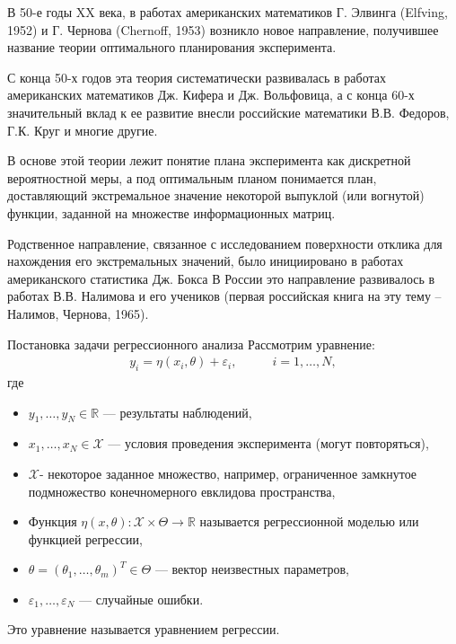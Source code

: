 \documentclass[10pt,slidestop,usepdftitle=false]{beamer}
\begin{document}
\begin{frame}
В 50-е годы XX века, в работах американских математиков Г. Элвинга (Elfving, 1952) и Г. Чернова (Chernoff, 1953) возникло новое направление, получившее название теории оптимального планирования эксперимента. 
\bigskip

\pause

С конца 50-х годов эта теория систематически развивалась в работах американских математиков Дж. Кифера и Дж. Вольфовица, а с конца 60-х значительный вклад к ее развитие внесли российские математики В.В. Федоров, Г.К. Круг и многие другие.

\bigskip

\pause

В основе этой теории лежит понятие плана эксперимента как дискретной вероятностной меры, а под оптимальным планом понимается план, доставляющий экстремальное значение некоторой выпуклой (или вогнутой) функции, заданной на множестве информационных матриц.

\bigskip
\pause

Родственное направление, связанное с исследованием поверхности отклика для нахождения его экстремальных значений, было инициировано в работах американского статистика Дж. Бокса  В России это направление развивалось в работах В.В. Налимова и его учеников (первая российская книга на эту тему – Налимов, Чернова, 1965).


\end{frame}
\begin{frame}{Постановка задачи регрессионного анализа}
 Рассмотрим уравнение:
 \begin{align*}
	y_{i} = \eta(x_i,\theta) + \varepsilon_{i}, \qquad &i = 1, \dots, N,
 \end{align*}
 где 
 \begin{itemize}
 \item $y_1,\dots,y_N \in \mathbb{R}$ --- результаты наблюдений,
 \pause
 \item $x_1,\dots,x_N \in \mathcal{X}$ --- условия проведения эксперимента (могут повторяться),
 \pause
 \item $\mathcal{X}$- некоторое заданное множество, например, ограниченное замкнутое подмножество конечномерного евклидова пространства,
 \pause
 \item Функция $\eta(x,\theta) : \mathcal{X} \times \Theta \rightarrow \mathbb{R}$ называется регрессионной моделью или функцией регрессии,
 \pause
 \item $\theta = (\theta_1,\dots,\theta_m)^T \in \Theta$ --- вектор неизвестных параметров,
 \pause
 \item $\varepsilon_1, \dots, \varepsilon_N$ --- случайные ошибки.
 \end{itemize}
 Это уравнение называется уравнением регрессии.
\end{frame}
\end{document}
